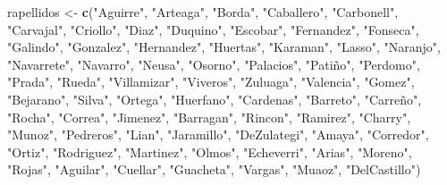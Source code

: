 \documentclass[
]{article}
\newenvironment{Shaded}{\begin{snugshade}}{\end{snugshade}}
\newcommand{\FunctionTok}[1]{\textcolor[rgb]{0.13,0.29,0.53}{\textbf{#1}}}
\newcommand{\NormalTok}[1]{#1}
\newcommand{\OtherTok}[1]{\textcolor[rgb]{0.56,0.35,0.01}{#1}}
\newcommand{\StringTok}[1]{\textcolor[rgb]{0.31,0.60,0.02}{#1}}
\begin{document}
\begin{Shaded}
\begin{Highlighting}[]
\NormalTok{rapellidos }\OtherTok{\textless{}{-}} \FunctionTok{c}\NormalTok{(}\StringTok{"Aguirre"}\NormalTok{, }\StringTok{"Arteaga"}\NormalTok{, }\StringTok{"Borda"}\NormalTok{, }\StringTok{"Caballero"}\NormalTok{, }\StringTok{"Carbonell"}\NormalTok{, }\StringTok{"Carvajal"}\NormalTok{, }\StringTok{"Criollo"}\NormalTok{, }\StringTok{"Diaz"}\NormalTok{, }\StringTok{"Duquino"}\NormalTok{, }\StringTok{"Escobar"}\NormalTok{, }\StringTok{"Fernandez"}\NormalTok{, }\StringTok{"Fonseca"}\NormalTok{, }\StringTok{"Galindo"}\NormalTok{, }\StringTok{"Gonzalez"}\NormalTok{, }\StringTok{"Hernandez"}\NormalTok{, }\StringTok{"Huertas"}\NormalTok{, }\StringTok{"Karaman"}\NormalTok{, }\StringTok{"Lasso"}\NormalTok{, }\StringTok{"Naranjo"}\NormalTok{, }\StringTok{"Navarrete"}\NormalTok{, }\StringTok{"Navarro"}\NormalTok{, }\StringTok{"Neusa"}\NormalTok{, }\StringTok{"Osorno"}\NormalTok{, }\StringTok{"Palacios"}\NormalTok{, }\StringTok{"Patiño"}\NormalTok{, }\StringTok{"Perdomo"}\NormalTok{, }\StringTok{"Prada"}\NormalTok{, }\StringTok{"Rueda"}\NormalTok{, }\StringTok{"Villamizar"}\NormalTok{, }\StringTok{"Viveros"}\NormalTok{, }\StringTok{"Zuluaga"}\NormalTok{, }\StringTok{"Valencia"}\NormalTok{, }\StringTok{"Gomez"}\NormalTok{, }\StringTok{"Bejarano"}\NormalTok{, }\StringTok{"Silva"}\NormalTok{, }\StringTok{"Ortega"}\NormalTok{, }\StringTok{"Huerfano"}\NormalTok{, }\StringTok{"Cardenas"}\NormalTok{, }\StringTok{"Barreto"}\NormalTok{, }\StringTok{"Carreño"}\NormalTok{, }\StringTok{"Rocha"}\NormalTok{, }\StringTok{"Correa"}\NormalTok{, }\StringTok{"Jimenez"}\NormalTok{, }\StringTok{"Barragan"}\NormalTok{, }\StringTok{"Rincon"}\NormalTok{, }\StringTok{"Ramirez"}\NormalTok{, }\StringTok{"Charry"}\NormalTok{, }\StringTok{"Munoz"}\NormalTok{, }\StringTok{"Pedreros"}\NormalTok{, }\StringTok{"Lian"}\NormalTok{, }\StringTok{"Jaramillo"}\NormalTok{, }\StringTok{"DeZulategi"}\NormalTok{, }\StringTok{"Amaya"}\NormalTok{, }\StringTok{"Corredor"}\NormalTok{, }\StringTok{"Ortiz"}\NormalTok{, }\StringTok{"Rodriguez"}\NormalTok{, }\StringTok{"Martinez"}\NormalTok{, }\StringTok{"Olmos"}\NormalTok{, }\StringTok{"Echeverri"}\NormalTok{, }\StringTok{"Arias"}\NormalTok{, }\StringTok{"Moreno"}\NormalTok{, }\StringTok{"Rojas"}\NormalTok{, }\StringTok{"Aguilar"}\NormalTok{, }\StringTok{"Cuellar"}\NormalTok{, }\StringTok{"Guacheta"}\NormalTok{, }\StringTok{"Vargas"}\NormalTok{, }\StringTok{"Muaoz"}\NormalTok{, }\StringTok{"DelCastillo"}\NormalTok{)}


\end{Highlighting}
\end{Shaded}
\end{document}
